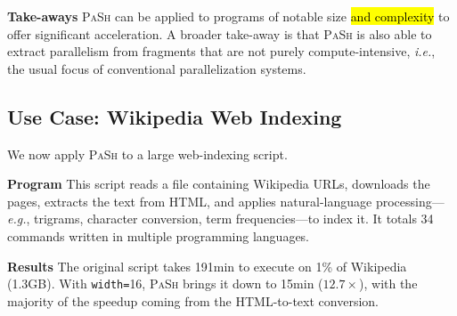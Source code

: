 \documentclass[sigplan, review, screen, anonymous]{acmart}
\newcommand{\eg}{{\em e.g.}, }
\newcommand{\ie}{{\em i.e.}, }
\newcommand{\heading}[1]{\vspace{4pt}\noindent\textbf{#1}\enspace}
\newcommand{\ttt}[1]{\texttt{#1}}
\newcommand{\todo}[1]{\hl{#1}\xspace}
\newcommand{\kk}[1]{[{\color{magenta}kk: #1}]}
\newcommand{\sys}{{\scshape PaSh}\xspace}
\newcommand{\unix}{{\scshape Unix}\xspace}
\begin{document}


\heading{Take-aways}
\sys can be applied to programs of notable size \todo{and complexity} to offer significant acceleration.
A broader take-away is that \sys is also able to extract parallelism from fragments that are not purely compute-intensive, \ie the usual focus of conventional parallelization systems.  



\subsection{Use Case: Wikipedia Web Indexing}
\label{macro2}

We now apply \sys to a large web-indexing script. %

\heading{Program}
This script reads a file containing Wikipedia URLs, downloads the pages,
extracts the text from HTML, and applies natural-language processing---\eg trigrams, character conversion, term frequencies---to index it.
It totals 34 commands written in multiple programming languages.

\heading{Results}
The original script takes 191min to execute on 1\% of Wikipedia (1.3GB).
With \ttt{width=}16, \sys brings it down to 15min ($12.7\times$), with the majority of the speedup coming from the HTML-to-text conversion. %
\end{document}
